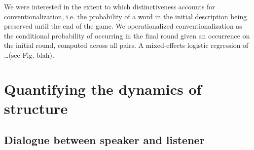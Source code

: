 \documentclass[alpha-refs]{wiley-article}
\begin{document}
We were interested in the extent to which distinctiveness accounts for conventionalization, i.e. the probability of a word in the initial description being preserved until the end of the game. 
We operationalized conventionalization as the conditional probability of occurring in the final round given an occurrence on the initial round, computed across all pairs. 
A mixed-effects logistic regression of \dots (see Fig. blah).


\section{Quantifying the dynamics of structure}\label{results}

\subsection{Dialogue between speaker and listener}\label{listener-feedback}
\end{document}
